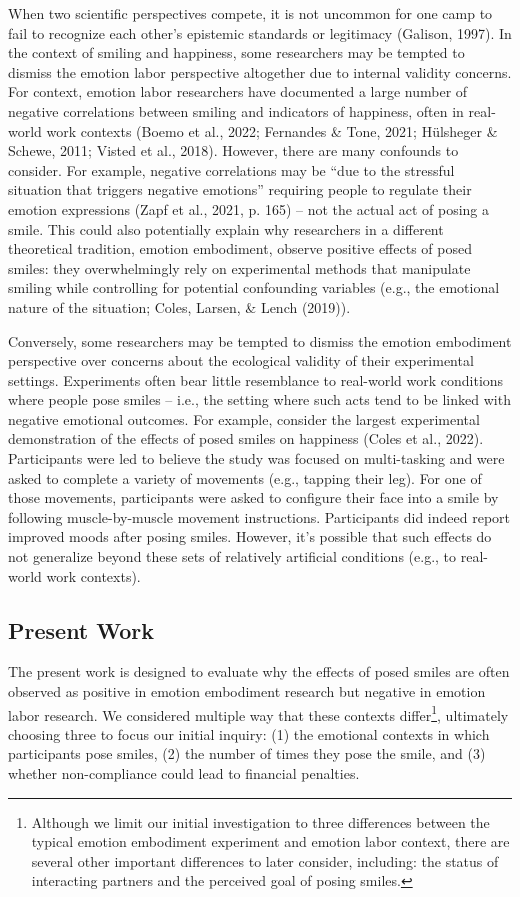 \documentclass[
  letterpaper,
  DIV=11,
  numbers=noendperiod]{scrartcl}
\begin{document}
When two scientific perspectives compete, it is not uncommon for one
camp to fail to recognize each other's epistemic standards or legitimacy
(Galison, 1997). In the context of smiling and happiness, some
researchers may be tempted to dismiss the emotion labor perspective
altogether due to internal validity concerns. For context, emotion labor
researchers have documented a large number of negative correlations
between smiling and indicators of happiness, often in real-world work
contexts (Boemo et al., 2022; Fernandes \& Tone, 2021; Hülsheger \&
Schewe, 2011; Visted et al., 2018). However, there are many confounds to
consider. For example, negative correlations may be ``due to the
stressful situation that triggers negative emotions'' requiring people
to regulate their emotion expressions (Zapf et al., 2021, p. 165) -- not
the actual act of posing a smile. This could also potentially explain
why researchers in a different theoretical tradition, emotion
embodiment, observe positive effects of posed smiles: they
overwhelmingly rely on experimental methods that manipulate smiling
while controlling for potential confounding variables (e.g., the
emotional nature of the situation; Coles, Larsen, \& Lench (2019)).

Conversely, some researchers may be tempted to dismiss the emotion
embodiment perspective over concerns about the ecological validity of
their experimental settings. Experiments often bear little resemblance
to real-world work conditions where people pose smiles -- i.e., the
setting where such acts tend to be linked with negative emotional
outcomes. For example, consider the largest experimental demonstration
of the effects of posed smiles on happiness ({Coles et al.}, 2022).
Participants were led to believe the study was focused on multi-tasking
and were asked to complete a variety of movements (e.g., tapping their
leg). For one of those movements, participants were asked to configure
their face into a smile by following muscle-by-muscle movement
instructions. Participants did indeed report improved moods after posing
smiles. However, it's possible that such effects do not generalize
beyond these sets of relatively artificial conditions (e.g., to
real-world work contexts).

\subsection{Present Work}\label{present-work}

The present work is designed to evaluate why the effects of posed smiles
are often observed as positive in emotion embodiment research but
negative in emotion labor research. We considered multiple way that
these contexts differ\footnote{Although we limit our initial
  investigation to three differences between the typical emotion
  embodiment experiment and emotion labor context, there are several
  other important differences to later consider, including: the status
  of interacting partners and the perceived goal of posing smiles.},
ultimately choosing three to focus our initial inquiry: (1) the
emotional contexts in which participants pose smiles, (2) the number of
times they pose the smile, and (3) whether non-compliance could lead to
financial penalties.
\end{document}
